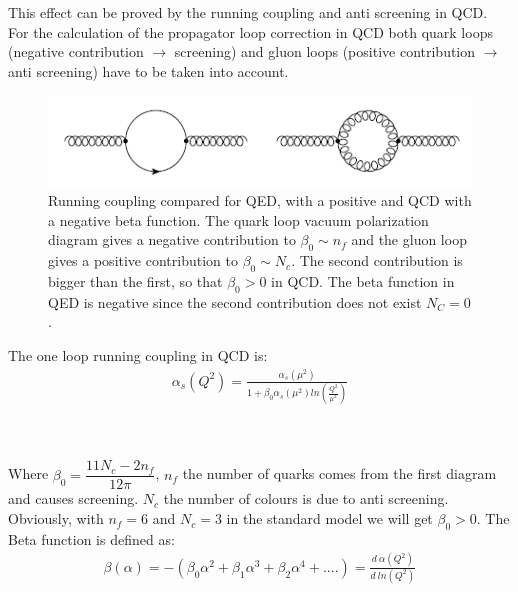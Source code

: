 This effect can be proved by the running coupling and anti screening in QCD.
For the calculation of the propagator loop correction in QCD both quark loops (negative contribution $ \rightarrow $ screening) and gluon loops (positive contribution $ \rightarrow $ anti screening) have to be taken into account. 
\begin{figure}[h!]
\centering
\includegraphics[scale=0.7]{images/Intro/quarkGluonPop.png}
\caption{Running coupling compared for QED, with a positive and QCD with a negative beta function. The quark loop vacuum polarization diagram gives a negative contribution
to $\beta_0 \sim n_f$ and the gluon loop gives a positive contribution to $\beta_0 \sim N_c$. The second contribution is bigger than the first, so that $ \beta_0 > 0 $ in QCD. The beta function in QED is negative since the second contribution does not exist $ N_C=0 $.}
\end{figure}

The one loop running coupling in QCD is:
\begin{equation}
\begin{split}
\alpha_s(Q^2)= \frac{\alpha_s(\mu^2)}{1+\beta_0 \alpha_s(\mu^2) ln(\frac{Q^2}{\mu^2})}
\end{split}
\end{equation}
\\
\\
\pagebreak

Where $ \beta_0 = \dfrac{11N_c -2n_f}{12\pi} $, $ n_f $ the number of quarks comes from the first diagram and causes screening.  $ N_c $ the number of colours is due to anti screening. Obviously, with $ n_f = 6 $ and $ N_c = 3 $ in the standard model we will get $ \beta_0 >0 $. The Beta function is defined as:
\begin{equation}
\begin{split}
\beta(\alpha)=-(\beta_0 \alpha^2 + \beta_1 \alpha^3+\beta_2\alpha^4+....)=\frac{d\:\alpha(Q^2)}{d \:ln(Q^2)}
\end{split}
\end{equation}


